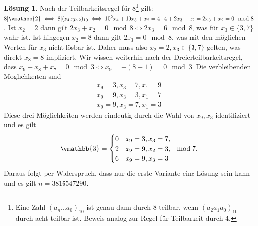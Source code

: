 \documentclass{article}
\theoremstyle{plain} %
\theoremstyle{definition} %
\newtheorem{solution}[theorem]{Lösung}
\begin{document}
\begin{solution}
  Nach der Teilbarkeitsregel für $8$\footnote{Eine Zahl $(a_n...a_0)_{10}$ ist genau dann durch 8 teilbar, wenn $(a_2a_1a_0)_{10}$ durch acht teilbar ist. Beweis analog zur Regel für Teilbarkeit durch 4.} gilt: $8 | \vmathbb{2} \iff 8 | (x_4x_3x_2)_{10} \iff 10^2x_4 + 10x_3 + x_2 = 4\cdot4 + 2x_3 + x_2 = 2x_3 + x_2 = 0 \mod{8}$. Ist $x_2 = 2$ dann gilt $2x_3 + x_2 = 0  \mod{8} \iff 2x_3 = 6 \mod{8}$, was für $x_3 \in \{3,7\}$ wahr ist. Ist hingegen $x_2 = 8$ dann gilt $2x_3 = 0 \mod{8}$, was mit den möglichen Werten für $x_3$ nicht lösbar ist. Daher muss also $x_2 = 2, x_3 \in \{3,7\}$ gelten, was direkt $x_8 = 8$ impliziert.
  Wir wissen weiterhin nach der Dreierteilbarkeitsregel, dass $x_9 + x_8 + x_7 = 0 \mod{3} \iff x_9 = -(8 + 1) = 0 \mod{3}$. Die verbleibenden Möglichkeiten sind
  \begin{align*}
    x_9  = 3, x_3 = 7, x_1 = 9 \\
    x_9 = 9, x_3 = 3, x_1 = 7  \\
    x_9 = 9, x_3 = 7, x_1 = 3
  \end{align*}
  Diese drei Möglichkeiten werden eindeutig durch die Wahl von $x_9, x_3$ identifiziert und es gilt $$\vmathbb{3} = \begin{cases}
      0 & x_9 = 3, x_3 = 7, \\
      2 & x_9 = 9, x_3 = 3, \\
      6 & x_9 = 9, x_3 = 3
    \end{cases} \mod{7}.$$ Daraus folgt per Widerspruch, dass nur die erste Variante eine Lösung sein kann und es gilt $n = 3816547290$.
\end{solution}
\end{document}

